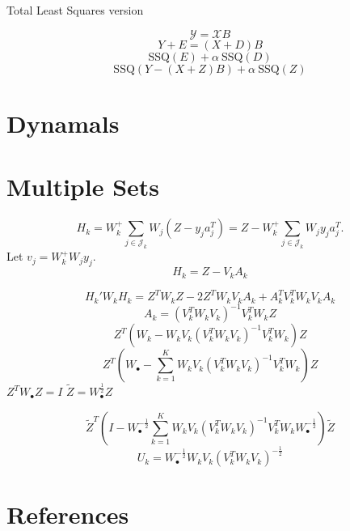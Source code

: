 \documentclass[
  12pt,
]{article}
\begin{document}
Total Least Squares version

\[
\mathcal{Y}=\mathcal{X}B
\]
\[
Y+E=(X+D)B
\]
\[
\text{SSQ}(E)+\alpha\ \text{SSQ}(D)
\]
\[
\text{SSQ}(Y-(X+Z)B)+\alpha\ \text{SSQ}(Z)
\]

\hypertarget{dynamals}{%
\section{Dynamals}\label{dynamals}}

\hypertarget{multiple-sets}{%
\section{Multiple Sets}\label{multiple-sets}}

\[
H_k=W_k^+\sum_{j\in\mathcal{J}_k}W_j(Z-y_ja_j^T)=Z-W_k^+\sum_{j\in\mathcal{J}_k}W_jy_ja_j^T.
\]
Let \(v_j=W_k^+W_jy_j\).
\[
H_k=Z-V_kA_k
\]

\[
H_k'W_kH_k=Z^TW_kZ-2Z^TW_kV_kA_k+A_k^TV_k^TW_kV_kA_k
\]
\[
A_k=(V_k^TW_kV_k)^{-1}V_k^TW_kZ
\]
\[
Z^T(W_k-W_kV_k(V_k^TW_kV_k)^{-1}V_k^TW_k)Z
\]
\[
Z^T(W_\bullet-\sum_{k=1}^KW_kV_k(V_k^TW_kV_k)^{-1}V_k^TW_k)Z
\]
\(Z^TW_\bullet Z=I\) \(\tilde Z=W_\bullet^\frac12 Z\)

\[
\tilde Z^T(I-W_\bullet^{-\frac12}\sum_{k=1}^KW_kV_k(V_k^TW_kV_k)^{-1}V_k^TW_kW_\bullet^{-\frac12})\tilde Z
\]
\[
U_k=W_\bullet^{-\frac12}W_kV_k(V_k^TW_kV_k)^{-\frac12}
\]

\hypertarget{references}{%
\section*{References}\label{references}}
\end{document}
